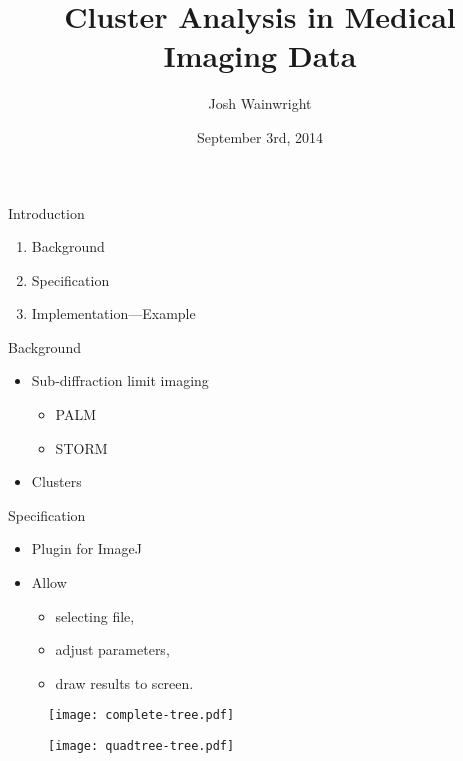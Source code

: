 \documentclass{beamer}
\title{Cluster Analysis in Medical Imaging Data}
\author{Josh Wainwright}
\institute{Iain Styles}
\date{September 3rd, 2014}
\begin{document}
\graphicspath{ {images/} }

\begin{frame}
\titlepage%
\end{frame}

\begin{frame}{Introduction}
	\begin{enumerate}
		\item Background
		\item Specification
		\item Implementation---Example
	\end{enumerate}
\end{frame}

\begin{frame}{Background}
	\begin{itemize}
		\item Sub-diffraction limit imaging
			\begin{itemize}
				\item PALM
				\item STORM
			\end{itemize}
		\item Clusters
	\end{itemize}
\end{frame}

\begin{frame}{Specification}
	\begin{itemize}
		\item Plugin for ImageJ
		\item Allow
			\begin{itemize}
				\item selecting file,
				\item adjust parameters,
				\item draw results to screen.
			\end{itemize}
	\end{itemize}

\end{frame}

\begin{frame}
	\begin{figure}
		\texttt{[image: complete-tree.pdf]}
	\end{figure}
\end{frame}

\begin{frame}
	\begin{figure}
		\texttt{[image: quadtree-tree.pdf]}
	\end{figure}
\end{frame}
\end{document}
